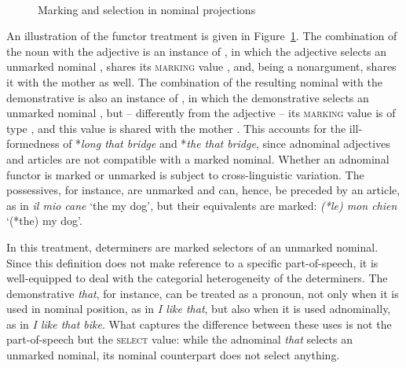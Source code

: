 \documentclass[output=paper,biblatex,babelshorthands,newtxmath,draftmode,colorlinks,citecolor=brown]{langscibook}
\begin{document}
\begin{exe}
\ex\label{hein} 
 \impl \\
\end{exe}    

\begin{figure}
\centering
{}
\caption{\label{markyy} Marking and selection in nominal projections}
\end{figure}

An illustration of the functor treatment is given in Figure~\ref{markyy}.
The combination of the noun with the adjective is an instance of , 
in which the adjective selects an unmarked nominal ,  
shares its \textsc{marking} value , and, being a nonargument, 
shares it with the mother as well. 
The combination of the resulting nominal with the demonstrative is also 
an instance of ,
in which the demonstrative selects an unmarked nominal , 
but -- differently from the adjective -- its \textsc{marking} value is of type 
, and this value is shared with the mother .    
This accounts for the ill-formedness of 
*\emph{long that bridge} and *\emph{the that bridge}, since 
adnominal adjectives and articles are not compatible with a marked nominal.  
Whether an adnominal functor is marked or unmarked is subject to cross-linguistic variation. 
The  possessives, for instance, are unmarked and can, hence, be preceded 
by an article, as in \emph{il mio cane} `the my dog', but   
their  equivalents are marked: \emph{(*le) mon chien} `(*the) my dog'. 

In this treatment, determiners are marked selectors of an unmarked nominal. 
Since this definition does not make reference to a specific part-of-speech, 
it is well-equipped to deal with the categorial heterogeneity of the determiners. 
The  demonstrative \emph{that}, for instance, 
can be treated as a pronoun, not only when it is used in nominal position, as in 
\emph{I like that}, but also when it is used adnominally, as in \emph{I like that bike}.   
What captures the difference between these uses is not the part-of-speech but  
the \textsc{select} value: while the adnominal \emph{that} selects an unmarked nominal, 
its nominal counterpart does not select anything.      
\end{document}
